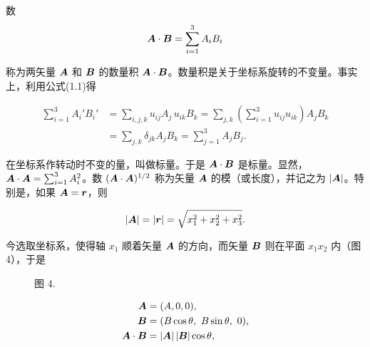 数
\begin{equation*}
\bm{A} \cdot \bm{B} = \sum_{i=1}^{3} A_i B_i
\end{equation*}

称为两矢量 $\bm{A}$ 和 $\bm{B}$ 的数量积 $\bm{A} \cdot \bm{B}$。数量积是关于坐标系旋转的不变量。事实上，利用公式(1.1)得

\begin{equation*}
\begin{aligned}
\sum_{i=1}^{3} A_i' B_i'
&= \sum_{i,j,k} u_{ij} A_j\, u_{ik} B_k
 = \sum_{j,k} \left(\sum_{i=1}^{3} u_{ij} u_{ik}\right) A_j B_k\\
&= \sum_{j,k} \delta_{jk} A_j B_k = \sum_{j=1}^{3} A_j B_j.
\end{aligned}
\end{equation*}

在坐标系作转动时不变的量，叫做标量。于是 $\bm{A} \cdot \bm{B}$ 是标量。显然，$\bm{A} \cdot \bm{A} = \sum_{i=1}^{3} A_i^{2}$。数 $(\bm{A} \cdot \bm{A})^{1/2}$ 称为矢量 $\bm{A}$ 的模（或长度），并记之为 $|\bm{A}|$。特别是，如果 $\bm{A} = \bm{r}$，则

\begin{equation*}
|\bm{A}| = |\bm{r}| = \sqrt{x_1^{2} + x_2^{2} + x_3^{2}}.
\end{equation*}

今选取坐标系，使得轴 $x_1$ 顺着矢量 $\bm{A}$ 的方向，而矢量 $\bm{B}$ 则在平面 $x_1 x_2$ 内（图 4），于是

\begin{figure}[htbp]
\centering
{}
\par\vspace{2pt}
{\small 图 4.}
\end{figure}

\begin{equation*}
\begin{aligned}
\bm{A} &= (A, 0, 0),\\
\bm{B} &= (B \cos\theta,\ B \sin\theta,\ 0),\\
\bm{A} \cdot \bm{B} &= |\bm{A}|\,|\bm{B}| \cos\theta,
\end{aligned}
\end{equation*}

